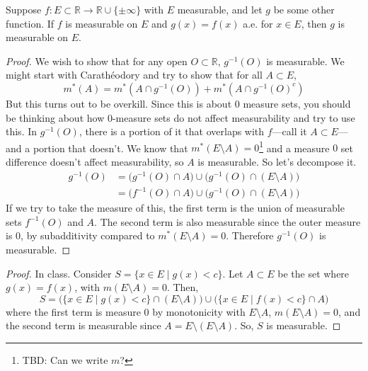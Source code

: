   \begin{theorem}
    Suppose $f: E \subset \mathbb{R} \to \mathbb{R} \cup \{\pm \infty\}$ with $E$ measurable, and let $g$ be some other function. If $f$ is measurable on $E$ and $g(x) = f(x)$ a.e. for $x \in E$, then $g$ is measurable on $E$. 
  \end{theorem}
  \begin{proof}
    We wish to show that for any open $O \subset \mathbb{R}$, $g^{-1} (O)$ is measurable. We might start with Carathéodory and try to show that for all $A \subset E$, 
    \begin{equation}
      m^\ast(A) = m^\ast (A \cap g^{-1}(O)) + m^\ast (A \cap g^{-1}(O)^c)
    \end{equation}
    But this turns out to be overkill. Since this is about $0$ measure sets, you should be thinking about how $0$-measure sets do not affect measurability and try to use this. In $g^{-1}(O)$, there is a portion of it that overlaps with $f$---call it $A \subset E$---and a portion that doesn't. We know that $m^\ast (E \setminus A) = 0$\footnote{TBD: Can we write $m$? } and a measure $0$ set difference doesn't affect measurability, so $A$ is measurable. So let's decompose it. 
    \begin{align}
      g^{-1} (O) & = \big( g^{-1} (O) \cap A \big) \cup \big( g^{-1} (O) \cap (E \setminus A) \big) \\ 
                 & = \big( f^{-1} (O) \cap A \big) \cup \big( g^{-1} (O) \cap (E \setminus A) \big)
    \end{align}
    If we try to take the measure of this, the first term is the union of measurable sets $f^{-1} (O)$ and $A$. The second term is also measurable since the outer measure is $0$, by subadditivity compared to $m^\ast(E \setminus A) = 0$. Therefore $g^{-1} (O)$ is measurable. 
  \end{proof}
  \begin{proof}
    In class. Consider $S = \{x \in E \mid g(x) < c \}$. Let $A \subset E$ be the set where $g(x) = f(x)$, with $m (E \setminus A) = 0$. Then, 
    \begin{equation}
      S = \big( \{x \in E \mid g(x) < c\} \cap (E \setminus A) \big) \cup \big( \{x \in E \mid f(x) < c\} \cap A \big) 
    \end{equation}
    where the first term is measure $0$ by monotonicity with $E \setminus A$, $m(E \setminus A) = 0$, and the second term is measurable since $A = E \setminus (E \setminus A)$. So, $S$ is measurable. 
  \end{proof}

